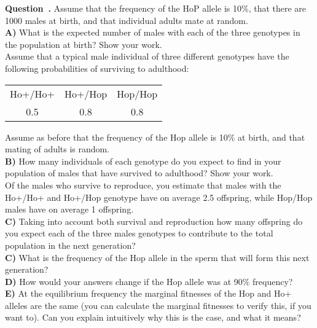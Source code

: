 \documentclass[12pt]{article}
\newcounter{question}[section]   %
\newenvironment{question}[1][]{\refstepcounter{question}\par\medskip
   \textbf{Question~\thequestion. #1} \rmfamily}{\medskip}
\begin{document}
\begin{question}
Assume that the frequency of the HoP allele is 10\%, that there are 1000 males at birth, and that individual adults mate at random.\\
{\bf A)} What is the expected number of males with each of the three genotypes in the population at birth? Show your work.\\

Assume that a typical male individual of three different genotypes
have the following probabilities of surviving to adulthood:\\
\begin{center}
\begin{tabular}{ccc}
Ho+/Ho+  &	Ho+/Hop 	&Hop/Hop\\
0.5	&	0.8	&	0.8\\
\end{tabular}
\end{center}
Assume as before that the frequency of the Hop allele is 10\% at birth, and that mating of adults is random.  \\
{\bf B)} How many individuals of each genotype do you expect to find in your population of males that have survived to adulthood? Show your work.\\


Of the males who survive to reproduce, you estimate that males with the Ho+/Ho+
and Ho+/Hop  genotype have on average 2.5 offspring, while Hop/Hop males have
on average 1 offspring. \\

{\bf C)} Taking into account both survival and reproduction how many
offspring do you expect each of the three males genotypes to contribute to the total population in the next generation? \\

{\bf C)} What is the frequency of the Hop allele in the sperm that will form this next generation?  \\

{\bf D)}  How would your answers change if the Hop allele was at 90\% frequency? \\

{\bf E)} At the equilibrium frequency the marginal fitnesses of the Hop and Ho+ alleles are the same (you can calculate the marginal fitnesses to verify this, if you want to). Can you explain intuitively why this is the case, and what it means?\\
\end{question}
\end{document}
